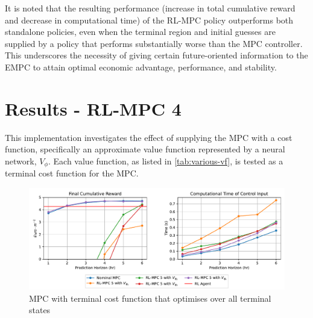 It is noted that the resulting performance (increase in total cumulative reward and decrease in computational time) of the RL-MPC policy outperforms both standalone policies, even when the terminal region and initial guesses are supplied by a policy that performs substantially worse than the MPC controller. This underscores the necessity of giving certain future-oriented information to the EMPC to attain optimal economic advantage, performance, and stability. 

\section{Results - RL-MPC 4}
This implementation investigates the effect of supplying the MPC with a cost function, specifically an approximate value function represented by a neural network, $V_{\phi}$. Each value function, as listed in \autoref{tab:various-vf}, is tested as a terminal cost function for the MPC.


\begin{figure}[H]
	\centering
	\includegraphics[width=\textwidth]{figures/rl_mpc_impl_4.pdf}
	\caption{MPC with terminal cost function that optimises over all terminal states}
	\label{fig:rlmpc-impl4-all-states}
\end{figure}


